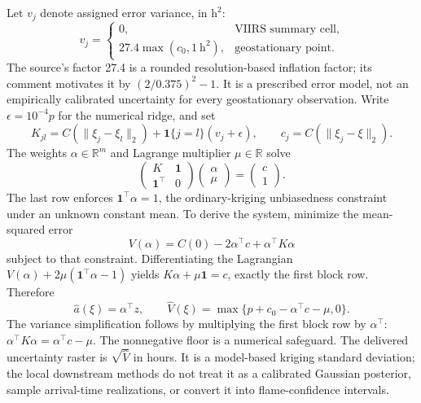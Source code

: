 \documentclass[11pt,a4paper]{article}
\newcommand{\R}{\mathbb{R}}
\newcommand{\Ind}{\mathbf{1}}
\begin{document}
Let $v_j$ denote assigned error variance, in $\mathrm{h^2}$:
\begin{equation}
v_j=\begin{cases}
0,&\text{VIIRS summary cell},\\
27.4\max(c_0,1\ \mathrm{h^2}),&\text{geostationary point}.
\end{cases}
\end{equation}
The source's factor 27.4 is a rounded resolution-based inflation factor; its
comment motivates it by $(2/0.375)^2-1$. It is a prescribed error model,
not an empirically calibrated uncertainty for every geostationary observation.
Write $\epsilon=10^{-4}p$ for the numerical ridge, and set
\begin{equation}
K_{jl}=C(\|\xi_j-\xi_l\|_2)+\Ind\{j=l\}(v_j+\epsilon),
\qquad c_j=C(\|\xi_j-\xi\|_2).
\end{equation}
The weights $\alpha\in\R^m$ and Lagrange multiplier $\mu\in\R$ solve
\begin{equation}
\begin{pmatrix}K&\boldsymbol 1\\\boldsymbol 1^\top&0\end{pmatrix}
\begin{pmatrix}\alpha\\\mu\end{pmatrix}
=\begin{pmatrix}c\\1\end{pmatrix}.
\label{eq:krigingsystem}
\end{equation}
The last row enforces $\boldsymbol1^\top\alpha=1$, the ordinary-kriging
unbiasedness constraint under an unknown constant mean.
To derive the system, minimize the mean-squared error
\begin{equation}
V(\alpha)=C(0)-2\alpha^\top c+\alpha^\top K\alpha
\end{equation}
subject to that constraint. Differentiating the Lagrangian
$V(\alpha)+2\mu(\boldsymbol1^\top\alpha-1)$ yields
$K\alpha+\mu\boldsymbol1=c$, exactly the first block row.
Therefore
\begin{equation}
\widehat a(\xi)=\alpha^\top z,\qquad
\widehat V(\xi)=\max\{p+c_0-\alpha^\top c-\mu,0\}.
\end{equation}
The variance simplification follows by multiplying the first block row by
$\alpha^\top$: $\alpha^\top K\alpha=\alpha^\top c-\mu$.
The nonnegative floor is a numerical safeguard. The delivered uncertainty
raster is $\sqrt{\widehat V}$ in hours. It is a model-based kriging standard
deviation; the local downstream methods do not treat it as a calibrated
Gaussian posterior, sample arrival-time realizations, or convert it into
flame-confidence intervals.
\end{document}
